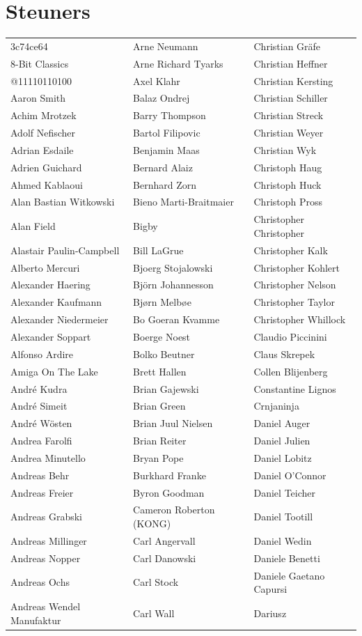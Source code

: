 \newpage
\section{Steuners}

\begin{small}
\setlength{\tabcolsep}{1mm}
\begin{tabular}{p{4cm}p{4cm}p{4cm}}
3c74ce64 & Arne Neumann & Christian Gräfe \\8-Bit Classics & Arne Richard Tyarks & Christian Heffner \\@11110110100 & Axel Klahr & Christian Kersting \\Aaron Smith & Balaz Ondrej & Christian Schiller \\Achim Mrotzek & Barry Thompson & Christian Streck \\Adolf Nefischer & Bartol Filipovic & Christian Weyer \\Adrian Esdaile & Benjamin Maas & Christian Wyk \\Adrien Guichard & Bernard Alaiz & Christoph Haug \\Ahmed Kablaoui & Bernhard Zorn & Christoph Huck \\Alan Bastian Witkowski & Bieno Marti-Braitmaier & Christoph Pross \\Alan Field & Bigby & Christopher Christopher \\Alastair Paulin-Campbell & Bill LaGrue & Christopher Kalk \\Alberto Mercuri & Bjoerg Stojalowski & Christopher Kohlert \\Alexander Haering & Björn Johannesson & Christopher Nelson \\Alexander Kaufmann & Bjørn Melbøe & Christopher Taylor \\Alexander Niedermeier & Bo Goeran Kvamme & Christopher Whillock \\Alexander Soppart & Boerge Noest & Claudio Piccinini \\Alfonso Ardire & Bolko Beutner & Claus Skrepek \\Amiga On The Lake & Brett Hallen & Collen Blijenberg \\André Kudra & Brian Gajewski & Constantine Lignos \\André Simeit & Brian Green & Crnjaninja \\André Wösten & Brian Juul Nielsen & Daniel Auger \\Andrea Farolfi & Brian Reiter & Daniel Julien \\Andrea Minutello & Bryan Pope & Daniel Lobitz \\Andreas Behr & Burkhard Franke & Daniel O'Connor \\Andreas Freier & Byron Goodman & Daniel Teicher \\Andreas Grabski & Cameron Roberton (KONG) & Daniel Tootill \\Andreas Millinger & Carl Angervall & Daniel Wedin \\Andreas Nopper & Carl Danowski & Daniele Benetti \\Andreas Ochs & Carl Stock & Daniele Gaetano Capursi \\Andreas Wendel Manufaktur & Carl Wall & Dariusz 
\end{tabular}
\end{small}
